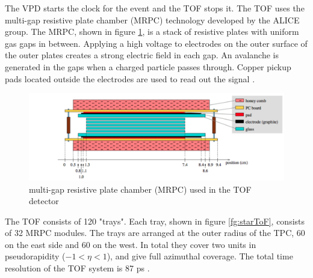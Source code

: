 \documentclass[abstract = on,listof=totoc, bibliography=totoc]{scrreprt}
\begin{document}
The VPD starts the clock for the event and the TOF stops it. The TOF uses the multi-gap resistive plate chamber (MRPC) technology developed by the ALICE group. The MRPC, shown in figure \ref{fig:MRPC}, is a stack of resistive plates with uniform gas gaps in between. Applying a high voltage to electrodes on the outer surface of the outer plates creates a strong electric field in each gap. An avalanche is generated in the gaps when a charged particle passes through. Copper pickup pads located outside the electrodes are used to read out the signal \cite{largeAreaTOF}. 
\begin{figure}
\begin{center}
\includegraphics[width = 1\textwidth]{MRPC}
\caption[multi-gap resistive plate chamber]{multi-gap resistive plate chamber (MRPC) used in the TOF detector \cite{largeAreaTOF}}
\label{fig:MRPC}
\end{center}
\end{figure}

The TOF consists of 120 "trays". Each tray, shown in figure \ref{fg:starToF}, consists of 32 MRPC modules. The trays are arranged at the outer radius of the TPC, 60 on the east side and 60 on the west. In total they cover two units in pseudorapidity ($-1<\eta<1$), and give full azimuthal coverage. The total time resolution of the TOF system is 87 ps \cite{largeAreaTOF}.   

\end{document}
